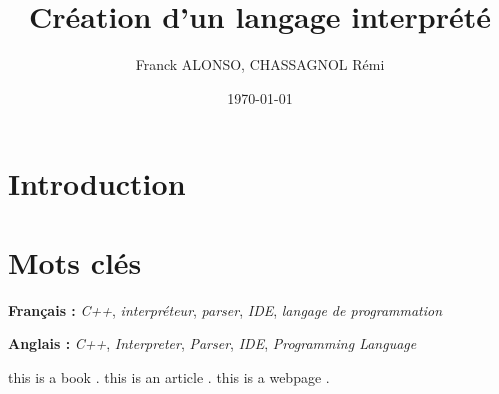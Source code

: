 \documentclass[a4paper]{article}
\title{Création d'un langage interprété}
\author{Franck ALONSO, CHASSAGNOL Rémi}
\date{\today}
\begin{document}
\maketitle

\section{Introduction}

\section{Mots clés}

\textbf{Français :} \textit{C++}, \textit{interpréteur}, \textit{parser},
\textit{IDE}, \textit{langage de programmation}

\textbf{Anglais :} \textit{C++}, \textit{Interpreter}, \textit{Parser},
\textit{IDE}, \textit{Programming Language}

this is a book \cite{levine2009flex}.
this is an article \cite{compilerTICH}.
this is a webpage \cite{cppparsing}.

\clearpage{}


\printbibliography[keyword={paper},title={Biliographie}]
\printbibliography[keyword={web},title={Webographie}]
\end{document}
